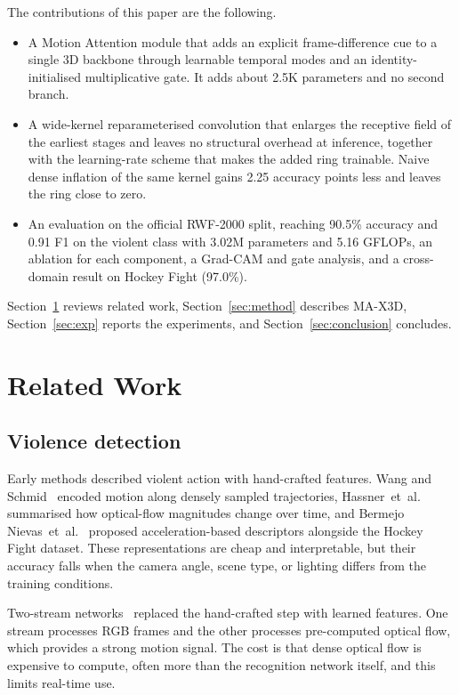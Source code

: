 \documentclass[conference]{IEEEtran}
\newif\ifdraft \drafttrue
\newcommand{\res}[1]{\ifdraft{\color{red}#1}\else#1\fi}
\begin{document}
The contributions of this paper are the following.
\begin{itemize}
  \item A Motion Attention module that adds an explicit
        frame-difference cue to a single 3D backbone through learnable
        temporal modes and an identity-initialised multiplicative gate.
        It adds about 2.5K parameters and no second branch.
  \item A wide-kernel reparameterised convolution that enlarges the
        receptive field of the earliest stages and leaves no structural
        overhead at inference, together with the learning-rate scheme
        that makes the added ring trainable. Naive dense inflation of
        the same kernel gains \res{2.25} accuracy points less and leaves the
        ring close to zero.
  \item An evaluation on the official RWF-2000 split, reaching \res{90.5\%}
        accuracy and \res{0.91} F1 on the violent class with 3.02M parameters
        and 5.16 GFLOPs, an ablation for each component, a Grad-CAM and
        gate analysis, and a cross-domain result on Hockey Fight
        (\res{97.0\%}).
\end{itemize}

Section~\ref{sec:related} reviews related work,
Section~\ref{sec:method} describes MA-X3D,
Section~\ref{sec:exp} reports the experiments, and
Section~\ref{sec:conclusion} concludes.

\section{Related Work}
\label{sec:related}

\subsection{Violence detection}

Early methods described violent action with hand-crafted features.
Wang and Schmid~\cite{idt} encoded motion along densely sampled
trajectories, Hassner~et~al.~\cite{vif} summarised how optical-flow
magnitudes change over time, and Bermejo Nievas~et~al.~\cite{hockey} proposed
acceleration-based descriptors alongside the Hockey Fight dataset.
These representations are cheap and interpretable, but their accuracy
falls when the camera angle, scene type, or lighting differs from the
training conditions.

Two-stream networks~\cite{twostream} replaced the hand-crafted step
with learned features. One stream processes RGB frames and the other
processes pre-computed optical flow, which provides a strong motion
signal. The cost is that dense optical flow is expensive to compute,
often more than the recognition network itself, and this limits
real-time use.
\end{document}
